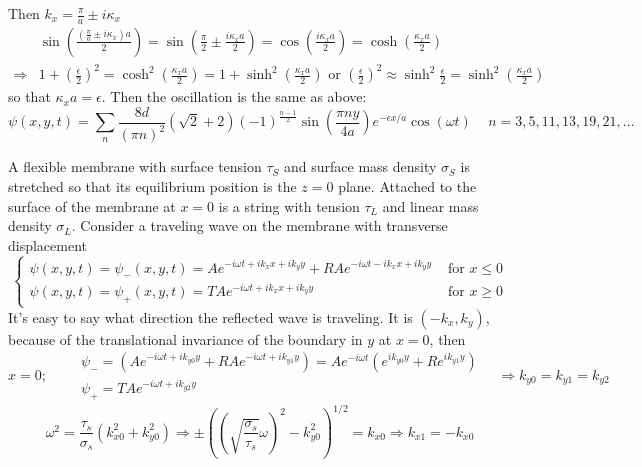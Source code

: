 \documentclass[twoside,10pt]{amsart}
\newcommand{\problemhead}[1]
  {\smallskip
   \noindent{\large\bf Problem #1.}
   \smallskip}
\begin{document}
\begin{enumerate}
Then $\boxed{ k_x = \frac{\pi}{a} \pm i \kappa_x}$
\[
\begin{aligned}
  & \sin{ \left( \frac{ \left( \frac{ \pi}{a} \pm i \kappa_x  \right) a }{ 2 } \right) } = \sin{ \left( \frac{ \pi}{2} \pm \frac{ i \kappa_x a}{2} \right) } = \cos{ \left( \frac{ i \kappa_x a}{2} \right) } = \cosh{ \left( \frac{\kappa_x a}{2} \right) } \\
\Longrightarrow   & 1 + \left( \frac{ \epsilon}{2} \right)^2 = \cosh^2{ \left( \frac{ \kappa_x a}{2} \right) } = 1 + \sinh^2{ \left( \frac{\kappa_x a}{2} \right) } \text{ or } \left( \frac{ \epsilon}{2} \right)^2 \approx \sinh^2{ \frac{ \epsilon}{2} } = \sinh^2{ \left( \frac{ \kappa_x a}{2} \right) }
\end{aligned}
\]
so that $\kappa_x a = \epsilon$.  Then the oscillation is the same as above:
\[
\boxed{ \psi(x,y,t) = \sum_n \frac{8d}{ (\pi n)^2} ( \sqrt{2} + 2) (-1)^{ \frac{ n-1}{2} } \sin{ \left( \frac{ \pi n y}{4a} \right) } e^{-\epsilon x/a} \cos{ (\omega t) } } \quad \, n = 3,5,11,13,19,21,\dots
\]
\end{enumerate}

\problemhead{11.4} A flexible membrane with surface tension $\tau_S$ and surface mass density $\sigma_S$ is stretched so that its equilibrium position is the $z=0$ plane.  Attached to the surface of the membrane at $x=0$ is a string with tension $\tau_L$ and linear mass density $\sigma_L$.  Consider a traveling wave on the membrane with transverse displacement
\[
\begin{cases}
  \psi(x,y,t) = \psi_-(x,y,t) = Ae^{ - i \omega t + i k_x x + i k_y y } + RAe^{ - i \omega t - i k_x x + i k_y y} & \text{ for } x \leq 0 \\
  \psi(x,y,t) = \psi_+(x,y,t) = TA e^{ -i \omega t + ik_x x + i k_y y } & \text{ for } x \geq 0 
\end{cases}
\]
It's easy to say what direction the reflected wave is traveling.  It is $(-k_x,k_y)$, because of the translational invariance of the boundary in $y$ at $x=0$, then
\[
x =0 ; \quad \, \begin{aligned}
  & \psi_- = (Ae^{-i \omega t + i k_{y0} y} + RAe^{ - i \omega t + i k_{y1} y } ) = Ae^{-i\omega t} (e^{ i k_{y0} y} + R e^{i k_{y1} y } ) \\
  & \psi_+ = TAe^{- i \omega t + i k_{y2} y } 
\end{aligned} \quad \Longrightarrow k_{y0} = k_{y1} = k_{y2} 
\]
\[
\omega^2 = \frac{ \tau_s}{\sigma_s} (k_{x0}^2 + k_{y0}^2 ) \Longrightarrow \pm \left( \left( \sqrt{ \frac{ \sigma_s}{\tau_s} } \omega \right)^2 - k_{y0}^2 \right)^{1/2} = k_{x0} \Longrightarrow k_{x1} = - k_{x0}
\]
\end{document}

